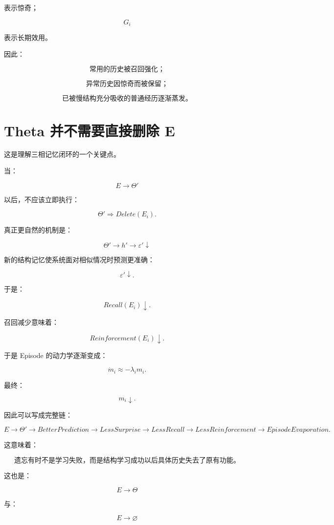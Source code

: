 表示惊奇；

\[
G_i
\]

表示长期效用。

因此：

\[
\boxed{
\text{常用的历史被召回强化；}
}
\]

\[
\boxed{
\text{异常历史因惊奇而被保留；}
}
\]

\[
\boxed{
\text{已被慢结构充分吸收的普通经历逐渐蒸发。}
}
\]


\section{Theta 并不需要直接删除 E}

这是理解三相记忆闭环的一个关键点。

当：

\[
E
\rightarrow
\Theta'
\]

以后，不应该立即执行：

\[
\Theta'\Rightarrow Delete(E_i).
\]

真正更自然的机制是：

\[
\boxed{
\Theta'
\rightarrow
h'
\rightarrow
\varepsilon'\downarrow
}
\]

新的结构记忆使系统面对相似情况时预测更准确：

\[
\varepsilon'\downarrow.
\]

于是：

\[
Recall(E_i)\downarrow.
\]

召回减少意味着：

\[
Reinforcement(E_i)\downarrow.
\]

于是 Episode 的动力学逐渐变成：

\[
\dot m_i
\approx
-\lambda_im_i.
\]

最终：

\[
m_i\downarrow.
\]

因此可以写成完整链：

\[
\boxed{
E
\rightarrow
\Theta'
\rightarrow
BetterPrediction
\rightarrow
LessSurprise
\rightarrow
LessRecall
\rightarrow
LessReinforcement
\rightarrow
EpisodeEvaporation.
}
\]

这意味着：

\[
\boxed{
\textbf{
遗忘有时不是学习失败，而是结构学习成功以后具体历史失去了原有功能。
}
}
\]

这也是：

\[
\boxed{
E\rightarrow\Theta
}
\]

与：

\[
\boxed{
E\rightarrow\varnothing
}
\]


